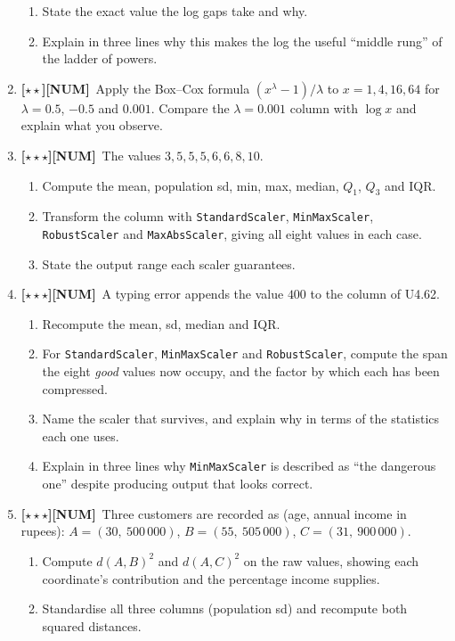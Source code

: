 \documentclass[11pt,a4paper]{article}
\newcommand{\LA}{{\footnotesize\textbf{[$\star\star\star$]}}}
\newcommand{\LB}{{\footnotesize\textbf{[$\star\star$]}}}
\newcommand{\NUM}{{\footnotesize\textbf{[NUM]}}}
\newcommand{\Q}[1]{\item[\textbf{#1}]}
\begin{document}
\begin{enumerate}[leftmargin=2.2cm]
\begin{enumerate}[label=(\alph*)]
    \item State the exact value the log gaps take and why.
    \item Explain in three lines why this makes the log the useful ``middle
      rung'' of the ladder of powers.
  \end{enumerate}
\Q{U4.61}\LB\NUM\ Apply the Box--Cox formula $(x^\lambda - 1)/\lambda$ to
  $x = 1, 4, 16, 64$ for $\lambda = 0.5$, $-0.5$ and $0.001$. Compare the
  $\lambda = 0.001$ column with $\log x$ and explain what you observe.
\Q{U4.62}\LA\NUM\ The values $3, 5, 5, 5, 6, 6, 8, 10$.
  \begin{enumerate}[label=(\alph*)]
    \item Compute the mean, population sd, min, max, median, $Q_1$, $Q_3$ and
      IQR.
    \item Transform the column with \texttt{StandardScaler},
      \texttt{MinMaxScaler}, \texttt{RobustScaler} and \texttt{MaxAbsScaler},
      giving all eight values in each case.
    \item State the output range each scaler guarantees.
  \end{enumerate}
\Q{U4.63}\LA\NUM\ A typing error appends the value $400$ to the column of
  U4.62.
  \begin{enumerate}[label=(\alph*)]
    \item Recompute the mean, sd, median and IQR.
    \item For \texttt{StandardScaler}, \texttt{MinMaxScaler} and
      \texttt{RobustScaler}, compute the span the eight \emph{good} values now
      occupy, and the factor by which each has been compressed.
    \item Name the scaler that survives, and explain why in terms of the
      statistics each one uses.
    \item Explain in three lines why \texttt{MinMaxScaler} is described as
      ``the dangerous one'' despite producing output that looks correct.
  \end{enumerate}
\Q{U4.64}\LA\NUM\ Three customers are recorded as (age, annual income in
  rupees): $A = (30,\ 500\,000)$, $B = (55,\ 505\,000)$,
  $C = (31,\ 900\,000)$.
  \begin{enumerate}[label=(\alph*)]
    \item Compute $d(A,B)^2$ and $d(A,C)^2$ on the raw values, showing each
      coordinate's contribution and the percentage income supplies.
    \item Standardise all three columns (population sd) and recompute both
      squared distances.

\end{enumerate}
\end{enumerate}
\end{document}
